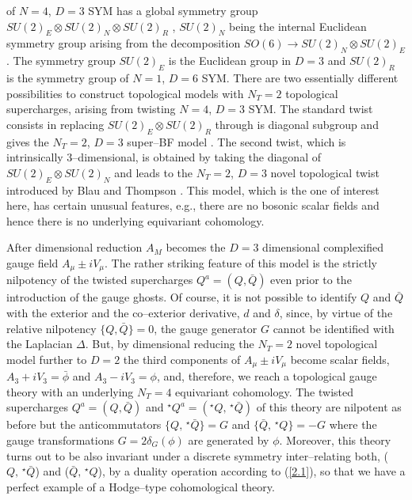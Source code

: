 \documentclass[a4paper,11pt]{article}
\begin{document}
of $N = 4$, $D = 3$ SYM has a global symmetry group 
$SU(2)_E \otimes SU(2)_N \otimes SU(2)_R$ \cite{17}, $SU(2)_N$ being the 
internal Euclidean symmetry group arising from the decomposition 
$SO(6) \rightarrow SU(2)_N \otimes SU(2)_E$. The symmetry group $SU(2)_E$ 
is the Euclidean group in $D = 3$ and $SU(2)_R$ is the symmetry group
of $N = 1$, $D = 6$ SYM. There are two essentially different 
possibilities to construct topological models with $N_T = 2$ topological
supercharges, arising from twisting $N = 4$, $D = 3$ SYM. The standard twist 
consists in replacing $SU(2)_E \otimes SU(2)_R$ through is diagonal 
subgroup and gives the $N_T = 2$, $D = 3$ super--BF model \cite{18}. The 
second twist, which is intrinsically 3--dimensional, is obtained by taking 
the diagonal of $SU(2)_E \otimes SU(2)_N$ and leads to the $N_T = 2$, $D = 3$
novel topological twist introduced by Blau and Thompson \cite{16}.
This model, which is the one of interest here, has certain unusual features, 
e.g., there are no bosonic scalar fields and hence there is no 
underlying equivariant cohomology. 

After dimensional reduction $A_M$ 
becomes the $D = 3$ dimensional complexified gauge field $A_\mu \pm i V_\mu$. 
The rather striking feature of this model is the strictly nilpotency of 
the twisted supercharges $Q^a = (Q, \bar{Q})$ even prior to the introduction
of the gauge ghosts. Of course, it is not possible to identify $Q$ and
$\bar{Q}$ with the exterior and the co--exterior derivative, $d$ and
$\delta$, since, by virtue of the relative nilpotency $\{ Q, \bar{Q} \} = 0$,
the gauge generator $G$ cannot be identified with the Laplacian $\Delta$. 
But, by dimensional reducing the $N_T = 2$ novel topological model further 
to $D = 2$ the third components of $A_\mu \pm i V_\mu$ become scalar fields, 
$A_3 + i V_3 = \bar{\phi}$ and $A_3 - i V_3 = \phi$, and, therefore, 
we reach a topological gauge theory with an underlying $N_T = 4$ equivariant 
cohomology. The twisted supercharges $Q^a = (Q, \bar{Q})$ and 
$^\star Q^a = (^\star Q, \,^\star \bar{Q})$ of this theory are 
nilpotent as before but the anticommutators 
$\{ Q, \,^\star \bar{Q} \} = G$ and $\{ \bar{Q}, \,^\star Q \} = - G$ 
where the gauge transformations $G =2 \delta_G(\phi)$ are
generated by $\phi$. Moreover, this theory turns out to be also invariant 
under a discrete symmetry inter--relating both, 
($Q, \,^\star \bar{Q}$) and ($\bar{Q}, \,^\star Q$), by a 
duality operation according to (\ref{2.1}), so that we have a perfect 
example of a Hodge--type cohomological theory. 
\end{document}
